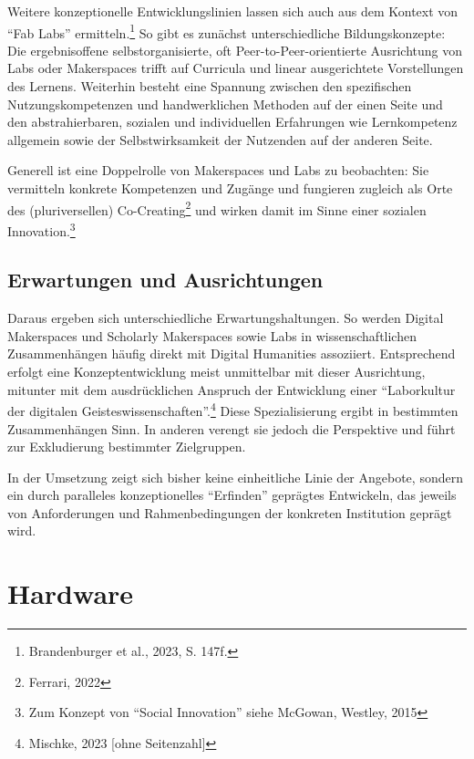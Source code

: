 \documentclass[a4paper,
fontsize=11pt,
oneside,
numbers=noperiodatend,
parskip=half-,
bibliography=totoc,
final
]{scrartcl}
\begin{document}
Weitere konzeptionelle Entwicklungslinien lassen sich auch aus dem
Kontext von \enquote{Fab Labs} ermitteln.\footnote{Brandenburger et al.,
  2023, S. 147f.} So gibt es zunächst unterschiedliche Bildungskonzepte:
Die ergebnisoffene selbstorganisierte, oft Peer-to-Peer-orientierte
Ausrichtung von Labs oder Makerspaces trifft auf Curricula und linear
ausgerichtete Vorstellungen des Lernens. Weiterhin besteht eine Spannung
zwischen den spezifischen Nutzungskompetenzen und handwerklichen
Methoden auf der einen Seite und den abstrahierbaren, sozialen und
individuellen Erfahrungen wie Lernkompetenz allgemein sowie der
Selbstwirksamkeit der Nutzenden auf der anderen Seite.

Generell ist eine Doppelrolle von Makerspaces und Labs zu beobachten:
Sie vermitteln konkrete Kompetenzen und Zugänge und fungieren zugleich
als Orte des (pluriversellen) Co-Creating\footnote{Ferrari, 2022} und
wirken damit im Sinne einer sozialen Innovation.\footnote{Zum Konzept
  von \enquote{Social Innovation} siehe McGowan, Westley, 2015}

\hypertarget{erwartungen-und-ausrichtungen}{%
\subsection{Erwartungen und
Ausrichtungen}\label{erwartungen-und-ausrichtungen}}

Daraus ergeben sich unterschiedliche Erwartungshaltungen. So werden
Digital Makerspaces und Scholarly Makerspaces sowie Labs in
wissenschaftlichen Zusammenhängen häufig direkt mit Digital Humanities
assoziiert. Entsprechend erfolgt eine Konzeptentwicklung meist
unmittelbar mit dieser Ausrichtung, mitunter mit dem ausdrücklichen
Anspruch der Entwicklung einer \enquote{Laborkultur der digitalen
Geisteswissenschaften}.\footnote{Mischke, 2023 {[}ohne Seitenzahl{]}}
Diese Spezialisierung ergibt in bestimmten Zusammenhängen Sinn. In
anderen verengt sie jedoch die Perspektive und führt zur Exkludierung
bestimmter Zielgruppen.

In der Umsetzung zeigt sich bisher keine einheitliche Linie der
Angebote, sondern ein durch paralleles konzeptionelles
\enquote{Erfinden} geprägtes Entwickeln, das jeweils von Anforderungen
und Rahmenbedingungen der konkreten Institution geprägt wird.

\hypertarget{hardware}{%
\section{Hardware}\label{hardware}}
\end{document}

